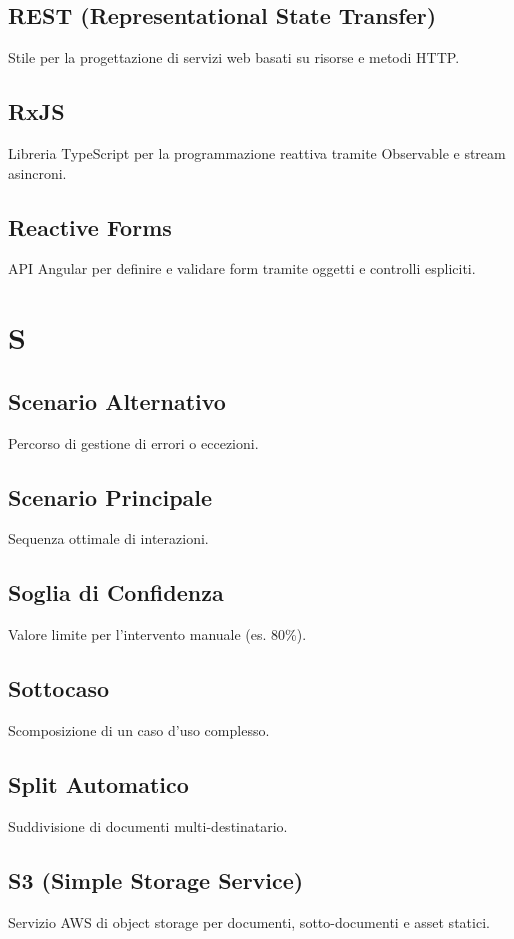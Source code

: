 \documentclass[a4paper,12pt]{article}
\begin{document}
\subsection{REST (Representational State Transfer)}
Stile per la progettazione di servizi web basati su risorse e metodi HTTP.

\subsection{RxJS}
Libreria TypeScript per la programmazione reattiva tramite Observable e stream asincroni.

\subsection{Reactive Forms}
API Angular per definire e validare form tramite oggetti e controlli espliciti.

\section{S}
\subsection{Scenario Alternativo}
Percorso di gestione di errori o eccezioni.

\subsection{Scenario Principale}
Sequenza ottimale di interazioni.

\subsection{Soglia di Confidenza}
Valore limite per l'intervento manuale (es. 80\%).

\subsection{Sottocaso}
Scomposizione di un caso d'uso complesso.

\subsection{Split Automatico}
Suddivisione di documenti multi-destinatario.

\subsection{S3 (Simple Storage Service)}
Servizio AWS di object storage per documenti, sotto-documenti e asset statici.
\end{document}

